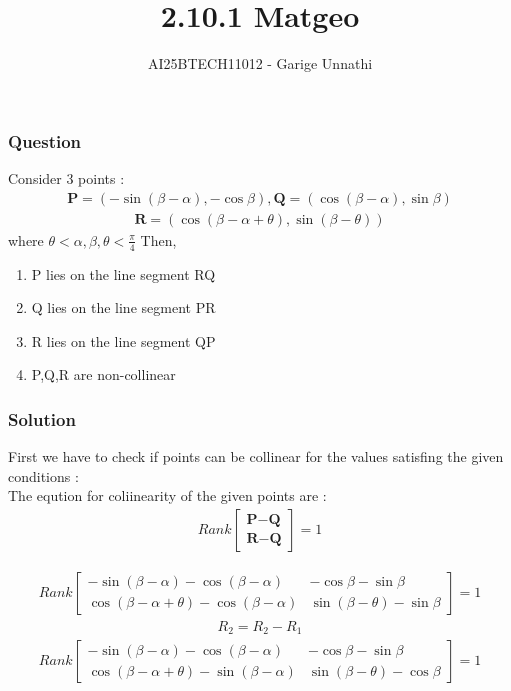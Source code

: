 \documentclass{beamer}
\title{2.10.1 Matgeo}
\author{AI25BTECH11012 - Garige Unnathi}
\date{}
\begin{document}
\frame{\titlepage}

\begin{frame}
\frametitle{Question}
Consider 3 points :
 \begin{align*}
     \textbf{P} = (-\sin(\beta - \alpha),-\cos\beta) , \textbf{Q} = (\cos(\beta - \alpha),\sin\beta)
 \end{align*}
\begin{align*}
    \textbf{R} = (\cos(\beta - \alpha + \theta),\sin(\beta - \theta))
\end{align*}
where $\theta < \alpha,\beta,\theta < \frac{\pi}{4}$ Then,
\begin{enumerate}
\item  P lies on the line segment RQ
\item  Q lies on the line segment PR
\item  R lies on the line segment QP
\item  P,Q,R are non-collinear
\end{enumerate}
\end{frame}





\begin{frame}
\frametitle{Solution}
First we have to check if points can be collinear for the values satisfing the given conditions :\\

The eqution for coliinearity of the given points are :\\
\begin{align}
   Rank\begin{bmatrix}
        \textbf{P} - \textbf{Q}\\
        \textbf{R} - \textbf{Q} \end{bmatrix} = 1
\end{align}


\end{frame}

\begin{frame}
\begin{align}
    Rank\begin{bmatrix}-\sin(\beta - \alpha) - \cos(\beta - \alpha) & -\cos\beta - \sin\beta \\
               \cos(\beta - \alpha + \theta) - \cos(\beta - \alpha) & \sin(\beta - \theta) - \sin\beta \end{bmatrix} = 1
\end{align} 
\begin{align}
     R_2 = R_2 - R_1
\end{align}
\begin{align}
Rank\begin{bmatrix}-\sin(\beta - \alpha) - \cos(\beta - \alpha) & -\cos\beta - \sin\beta \\
               \cos(\beta - \alpha + \theta) - \sin(\beta - \alpha) & \sin(\beta - \theta) - \cos\beta \end{bmatrix} = 1
\end{align}
\end{frame}
\end{document}

